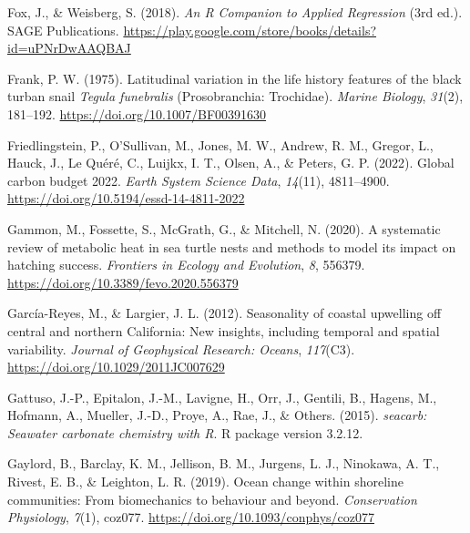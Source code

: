 \documentclass{CSUNthesis}
\begin{document}
\vspace{0.1em}

Fox, J., \& Weisberg, S. (2018). \textit{An R Companion to Applied Regression} (3rd ed.). SAGE Publications. \url{https://play.google.com/store/books/details?id=uPNrDwAAQBAJ}

\vspace{0.1em}

Frank, P. W. (1975). Latitudinal variation in the life history features of the black turban snail \textit{Tegula funebralis} (Prosobranchia: Trochidae). \textit{Marine Biology}, \textit{31}(2), 181--192. \url{https://doi.org/10.1007/BF00391630}

\vspace{0.1em}

Friedlingstein, P., O'Sullivan, M., Jones, M. W., Andrew, R. M., Gregor, L., Hauck, J., Le Quéré, C., Luijkx, I. T., Olsen, A., \& Peters, G. P. (2022). Global carbon budget 2022. \textit{Earth System Science Data}, \textit{14}(11), 4811--4900. \url{https://doi.org/10.5194/essd-14-4811-2022}

\vspace{0.1em}

Gammon, M., Fossette, S., McGrath, G., \& Mitchell, N. (2020). A systematic review of metabolic heat in sea turtle nests and methods to model its impact on hatching success. \textit{Frontiers in Ecology and Evolution}, \textit{8}, 556379. \url{https://doi.org/10.3389/fevo.2020.556379}

\vspace{0.1em}

García-Reyes, M., \& Largier, J. L. (2012). Seasonality of coastal upwelling off central and northern California: New insights, including temporal and spatial variability. \textit{Journal of Geophysical Research: Oceans}, \textit{117}(C3). \url{https://doi.org/10.1029/2011JC007629}

\vspace{0.1em}

Gattuso, J.-P., Epitalon, J.-M., Lavigne, H., Orr, J., Gentili, B., Hagens, M., Hofmann, A., Mueller, J.-D., Proye, A., Rae, J., \& Others. (2015). \textit{seacarb: Seawater carbonate chemistry with R}. R package version 3.2.12.

\vspace{0.1em}

Gaylord, B., Barclay, K. M., Jellison, B. M., Jurgens, L. J., Ninokawa, A. T., Rivest, E. B., \& Leighton, L. R. (2019). Ocean change within shoreline communities: From biomechanics to behaviour and beyond. \textit{Conservation Physiology}, \textit{7}(1), coz077. \url{https://doi.org/10.1093/conphys/coz077}
\end{document}
